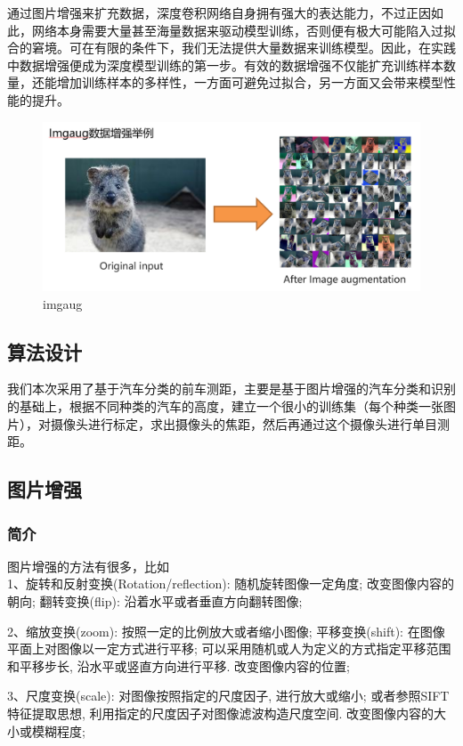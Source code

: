 \documentclass[12pt]{report}
\begin{document}
通过图片增强来扩充数据，深度卷积网络自身拥有强大的表达能力，不过正因如此，网络本身需要大量甚至海量数据来驱动模型训练，否则便有极大可能陷入过拟合的窘境。可在有限的条件下，我们无法提供大量数据来训练模型。因此，在实践中数据增强便成为深度模型训练的第一步。有效的数据增强不仅能扩充训练样本数量，还能增加训练样本的多样性，一方面可避免过拟合，另一方面又会带来模型性能的提升。

\begin{figure}[h]
  \centering
  \includegraphics[width=.8\textwidth]{2.png} %
  \caption{imgaug} %
  \label{img2} %
\end{figure}

\subsection{算法设计}
我们本次采用了基于汽车分类的前车测距，主要是基于图片增强的汽车分类和识别的基础上，根据不同种类的汽车的高度，建立一个很小的训练集（每个种类一张图片），对摄像头进行标定，求出摄像头的焦距，然后再通过这个摄像头进行单目测距。

\subsection{图片增强}
\subsubsection{简介}
图片增强的方法有很多，比如\\
1、旋转和反射变换(Rotation/reflection): 随机旋转图像一定角度; 改变图像内容的朝向;
翻转变换(flip): 沿着水平或者垂直方向翻转图像;

2、缩放变换(zoom): 按照一定的比例放大或者缩小图像;
平移变换(shift): 在图像平面上对图像以一定方式进行平移; 
可以采用随机或人为定义的方式指定平移范围和平移步长, 沿水平或竖直方向进行平移. 改变图像内容的位置;

3、尺度变换(scale): 对图像按照指定的尺度因子, 进行放大或缩小; 或者参照SIFT特征提取思想, 利用指定的尺度因子对图像滤波构造尺度空间. 改变图像内容的大小或模糊程度;
\end{document}
